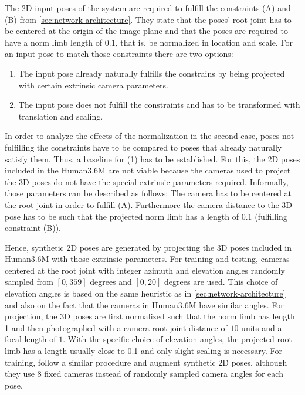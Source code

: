 The 2D input poses of the system are required to fulfill the constraints (A) and (B) from \autoref{sec:network-architecture}. 
They state that the poses' root joint has to be centered at the origin of the image plane and that the poses are required to have a norm limb length of $0.1$, that is, be normalized in location and scale.
For an input pose to match those constraints there are two options:
\begin{enumerate}
	\item The input pose already naturally fulfills the constrains by being projected with certain extrinsic camera parameters.
	\item The input pose does not fulfill the constraints and has to be transformed with translation and scaling.
\end{enumerate}
In order to analyze the effects of the normalization in the second case, poses not fulfilling the constraints have to be compared to poses that already naturally satisfy them.
Thus, a baseline for (1) has to be established.
For this, the 2D poses included in the Human3.6M are not viable because the cameras used to project the 3D poses do not have the special extrinsic parameters required.
Informally, those parameters can be described as follows:
The camera has to be centered at the root joint in order to fulfill (A). 
Furthermore the camera distance to the 3D pose has to be such that the projected norm limb has a length of 0.1 (fulfilling constraint (B)).

Hence, synthetic 2D poses are generated by projecting the 3D poses included in Human3.6M with those extrinsic parameters.
For training and testing, cameras centered at the root joint with integer azimuth and elevation angles randomly sampled from $[0, 359]$ degrees and $[0, 20]$ degrees are used.
This choice of elevation angles is based on the same heuristic as in \autoref{sec:network-architecture} and also on the fact that the cameras in Human3.6M have similar angles.
For projection, the 3D poses are first normalized such that the norm limb has length 1 and then photographed with a camera-root-joint distance of $10$ units and a focal length of $1$.
With the specific choice of elevation angles, the projected root limb has a length usually close to 0.1 and only slight scaling is necessary.
For training, \citet{drover18} follow a similar procedure and augment synthetic 2D poses, although they use 8 fixed cameras instead of randomly sampled camera angles for each pose.





